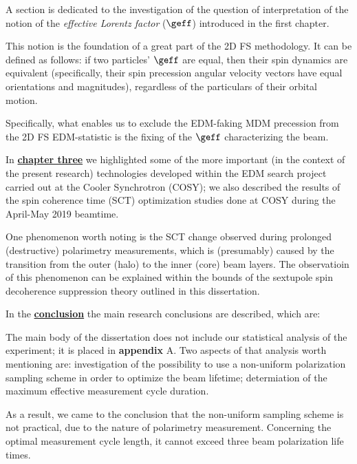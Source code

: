 A section is dedicated to the investigation of the question of interpretation of the notion of the \emph{effective Lorentz factor} ($\geff$) introduced in the first chapter. 

This notion is the foundation of a great part of the 2D FS methodology. It can be defined as follows: if two particles' $\geff$ are equal, then their spin dynamics are equivalent (specifically, their spin precession angular velocity vectors have equal orientations and magnitudes), regardless of the particulars of their orbital motion. 

Specifically, what enables us to exclude the EDM-faking MDM precession from the 2D FS EDM-statistic is the fixing of the $\geff$ characterizing the beam.

In \underline{\textbf{chapter three}} we highlighted some of the more important (in the context of the present research) technologies developed within the EDM search project carried out at the Cooler Synchrotron (COSY); we also described the results of the spin coherence time (SCT) optimization studies done at COSY during the April-May 2019 beamtime.

One phenomenon worth noting is the SCT change observed during prolonged (destructive) polarimetry measurements, which is (presumably) caused by the transition from the outer (halo) to the inner (core) beam layers. The observatioin of this phenomenon can be explained within the bounds of the sextupole spin decoherence suppression theory outlined in this dissertation.

In the \underline{\textbf{conclusion}} the main research conclusions are described, which are:


The main body of the dissertation does not include our statistical analysis of the experiment; it is placed in \textbf{appendix} A. Two aspects of that analysis worth mentioning are: investigation of the possibility to use a non-uniform polarization sampling scheme in order to optimize the beam lifetime; determiation of the maximum effective measurement cycle duration. 

As a result, we came to the conclusion that the non-uniform sampling scheme is not practical, due to the nature of polarimetry measurement. Concerning the optimal measurement cycle length, it cannot exceed three beam polarization life times.
